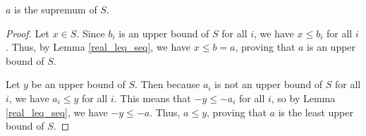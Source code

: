 \documentclass[../../math.tex]{subfiles}
\begin{document}
\begin{theorem}
    $a$ is the supremum of $S$.
\end{theorem}
\begin{proof}
    Let $x \in S$.  Since $b_i$ is an upper bound of $S$ for all $i$, we have $x
    \leq b_i$ for all $i$.  Thus, by Lemma \ref{real_leq_seq}, we have $x \leq b
    = a$, proving that $a$ is an upper bound of $S$.

    Let $y$ be an upper bound of $S$.  Then because $a_i$ is not an upper bound
    of $S$ for all $i$, we have $a_i \leq y$ for all $i$.  This means that $-y
    \leq -a_i$ for all $i$, so by Lemma \ref{real_leq_seq}, we have $-y \leq
    -a$.  Thus, $a \leq y$, proving that $a$ is the least upper bound of $S$.
\end{proof}
\end{document}
